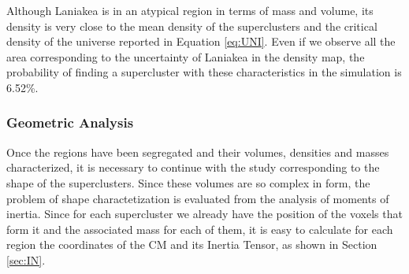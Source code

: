 \documentclass[a4paper,fleqn,usenatbib]{mnras}
\begin{document}

Although Laniakea is in an atypical region in terms of mass and volume, its density is very close to the mean density of the superclusters and the critical density of the universe reported in Equation \ref{eq:UNI}. Even if we observe all the area corresponding to the uncertainty of Laniakea in the density map, the probability of finding a supercluster with these characteristics in the simulation is 6.52\%.

\subsubsection{Geometric Analysis}
Once the regions have been segregated and their volumes, densities and masses characterized, it is necessary to continue with the study corresponding to the shape of the superclusters. Since these volumes are so complex in form, the problem of shape charactetization is evaluated from the analysis of moments of inertia. Since for each supercluster we already have the position of the voxels that form it and the associated mass for each of them, it is easy to calculate for each region the coordinates of the CM and its Inertia Tensor, as shown in Section \ref{sec:IN}.

\end{document}
